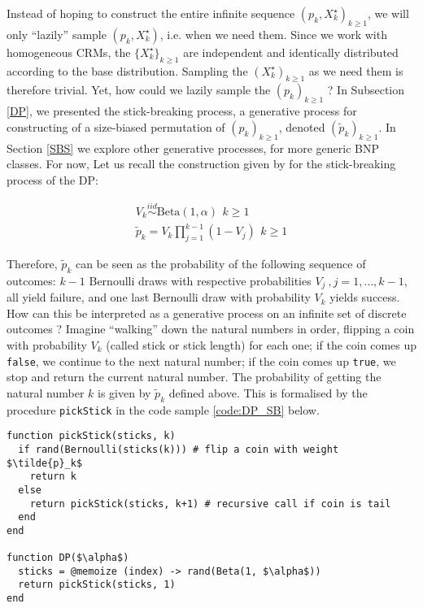 Instead of hoping to construct the entire infinite sequence $\left({p}_k, X^\star_k \right)_{k \ge 1}$, we will only ``lazily'' sample $\left({p}_k, X^\star_k \right)$, i.e. when we need them.
Since we work with homogeneous \glspl{CRM}, the $\{X^\star_k\}_{k \ge 1}$ are independent and identically distributed according to the base distribution. Sampling the $(X^\star_k)_{k \ge 1}$ as we need them is therefore trivial. Yet, how could we lazily sample the $({p}_k)_{k \ge 1}$ ?
In Subsection \ref{DP}, we presented the stick-breaking process, a generative process for constructing of a size-biased permutation of $({p}_k)_{k \ge 1}$, denoted $(\tilde{p}_k)_{k \ge 1}$.
In Section \ref{SBS} we explore other generative processes, for more generic \gls{BNP} classes. For now, Let us recall the construction given by \cite{sethuraman94} for the stick-breaking process of the \gls{DP}:


\begin{gather*}
V_k \stackrel{iid}{\sim} \text{Beta}(1, \alpha) \, \ k \ge 1 \\
\tilde{p}_k = V_k \prod_{j=1}^{k-1}(1-V_j)  \, \ k \ge 1
\end{gather*}

Therefore, $\tilde{p}_k$ can be seen as the probability of the following sequence of outcomes: $k-1$ Bernoulli draws with respective probabilities $V_j \ , j=1,\dots,k-1$, all yield failure, and one last Bernoulli draw with probability $V_k$ yields success.
How can this be interpreted as a generative process on an infinite set of discrete outcomes ?
Imagine ``walking'' down the natural numbers in order, flipping a coin with probability $V_k$ (called stick or stick length) for each one; if the coin comes up \texttt{false}, we continue to the next natural number; if the coin comes up \texttt{true}, we stop and return the current natural number. The probability of getting the natural number $k$ is given by $\tilde{p}_k$ defined above. This is formalised by the procedure \texttt{pickStick} in the code sample \ref{code:DP_SB} below. 

\begin{lstlisting}[caption={\acrlong{DP} stick-breaking representation written in Julia.},captionpos=b,label=code:DP_SB]
function pickStick(sticks, k)
  if rand(Bernoulli(sticks(k))) # flip a coin with weight $\tilde{p}_k$
    return k
  else
    return pickStick(sticks, k+1) # recursive call if coin is tail
  end
end

function DP($\alpha$)
  sticks = @memoize (index) -> rand(Beta(1, $\alpha$))
  return pickStick(sticks, 1)
end
\end{lstlisting}

